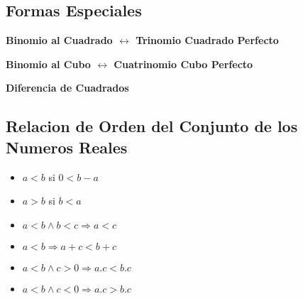 \documentclass[10pt]{article}
\begin{document}
\subsection{Formas Especiales}
\textbf{Binomio al Cuadrado $\leftrightarrow$ Trinomio Cuadrado Perfecto}
\begin{center}
\end{center}
\textbf{Binomio al Cubo $\leftrightarrow$ Cuatrinomio Cubo Perfecto}
\begin{center}
\end{center}
\textbf{Diferencia de Cuadrados}
\begin{center}
\end{center}
\subsection{Relacion de Orden del Conjunto de los Numeros Reales}
\begin{multicols}{3}
\begin{itemize}
\item $a<b$ si $0<b-a$
\item $a>b$ si $b<a$
\item $a<b \land b<c \Rightarrow a<c$
\item $a<b \Rightarrow a+c<b+c$
\item $a<b \land c>0 \Rightarrow a.c<b.c$
\item $a<b \land c<0 \Rightarrow a.c>b.c$
\end{itemize}
\end{multicols}
\end{document}
